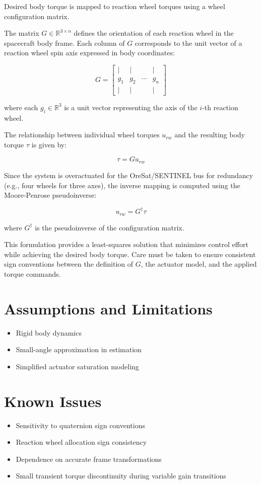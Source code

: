 Desired body torque is mapped to reaction wheel torques using a wheel configuration matrix.

The matrix $G \in \mathbb{R}^{3 \times n}$ defines the orientation of each reaction wheel in the spacecraft body frame. Each column of $G$ corresponds to the unit vector of a reaction wheel spin axis expressed in body coordinates:

\[
G =
\begin{bmatrix}
	| & | &        & | \\
	g_1 & g_2 & \cdots & g_n \\
	| & | &        & |
\end{bmatrix}
\]

where each $g_i \in \mathbb{R}^3$ is a unit vector representing the axis of the $i$-th reaction wheel.

The relationship between individual wheel torques $u_{rw}$ and the resulting body torque $\tau$ is given by:

\[
\tau = G u_{rw}
\]

Since the system is overactuated for the OreSat/SENTINEL bus for redundancy (e.g., four wheels for three axes), the inverse mapping is computed using the Moore-Penrose pseudoinverse:

\[
u_{rw} = G^\dagger \tau
\]

where $G^\dagger$ is the pseudoinverse of the configuration matrix.

This formulation provides a least-squares solution that minimizes control effort while achieving the desired body torque. Care must be taken to ensure consistent sign conventions between the definition of $G$, the actuator model, and the applied torque commands.

\section{Assumptions and Limitations}

\begin{itemize}
	\item Rigid body dynamics
	\item Small-angle approximation in estimation
	\item Simplified actuator saturation modeling
\end{itemize}

\section{Known Issues}

\begin{itemize}
	\item Sensitivity to quaternion sign conventions
	\item Reaction wheel allocation sign consistency
	\item Dependence on accurate frame transformations
	\item Small transient torque discontinuity during variable gain transitions
\end{itemize}